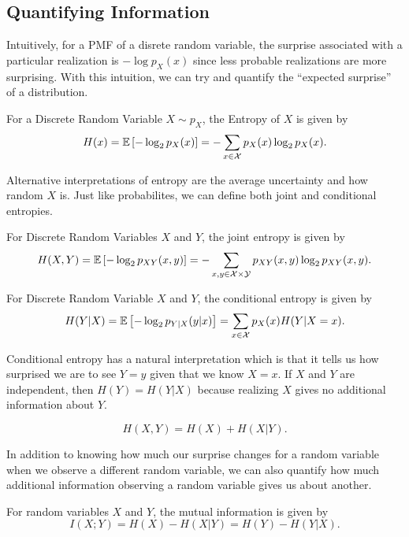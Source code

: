 \subsection{Quantifying Information}
Intuitively, for a PMF of a disrete random variable, the surprise associated with a particular realization is $-\log p_X(x)$ since less probable realizations are more surprising.
With this intuition, we can try and quantify the ``expected surprise'' of a distribution.
\begin{definition}
	For a Discrete Random Variable $X\sim p_X$, the Entropy of $X$ is given by \[
		H(x) = \mathbb{E}\left[-\log_2 p_X(x)\right] = -\sum_{x\in\mathcal{X}} p_X(x)\log_2p_X(x).
	\]
	\label{defn:entropy}
\end{definition}
Alternative interpretations of entropy are the average uncertainty and how random $X$ is.
Just like probabilites, we can define both joint and conditional entropies.
\begin{definition}
	For Discrete Random Variables $X$ and $Y$, the joint entropy is given by \[
		H(X,Y) = \mathbb{E}\left[-\log_2p_{XY}(x, y)\right] = -\sum_{x,y\in\mathcal{X}\times\mathcal{Y}}p_{XY}(x, y)\log_2p_{XY}(x, y).
	\]
	\label{defn:joint-entropy}
\end{definition}
\begin{definition}
	For Discrete Random Variable $X$ and $Y$, the conditional entropy is given by \[
		H(Y|X) = \mathbb{E}\left[-\log_2p_{Y|X}(y|x)\right] = \sum_{x\in\mathcal{X}}p_X(x)H(Y|X=x).
	\]
	\label{defn:conditional-entropy}
\end{definition}
Conditional entropy has a natural interpretation which is that it tells us how surprised we are to see $Y=y$ given that we know $X=x$.
If $X$ and $Y$ are independent, then $H(Y) = H(Y|X)$ because realizing $X$ gives no additional information about $Y$.
\begin{theorem}
	\[
		H(X, Y) = H(X) + H(X|Y).
	\]
	\label{thm:chain-entropy}
\end{theorem}
In addition to knowing how much our surprise changes for a random variable when we observe a different random variable, we can also quantify how much additional information observing a random variable gives us about another.
\begin{definition}
	For random variables $X$ and $Y$, the mutual information is given by \[
		I(X;Y) = H(X) - H(X|Y) = H(Y) - H(Y|X).
	\]
	\label{defn:mutual-info}
\end{definition}
